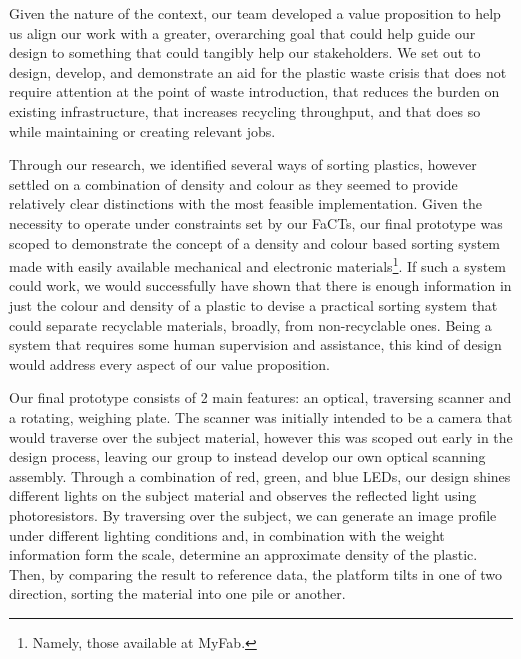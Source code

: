 \documentclass[12pt]{article}
\begin{document}
        Given the nature of the context, our team developed a value proposition to help us align our work with a greater, overarching goal that could help guide our design to something that could tangibly help our stakeholders. We set out to design, develop, and demonstrate an aid for the plastic waste crisis that does not require attention at the point of waste introduction, that reduces the burden on existing infrastructure, that increases recycling throughput, and that does so while maintaining or creating relevant jobs.

        Through our research, we identified several ways of sorting plastics, however settled on a combination of density and colour as they seemed to provide relatively clear distinctions \cite{gent2009recycling} \cite{safavi2010sorting} \cite{bruno2000automated} with the most feasible implementation. Given the necessity to operate under constraints set by our FaCTs, our final prototype was scoped to demonstrate the concept of a density and colour based sorting system made with easily available mechanical and electronic materials\footnote{Namely, those available at MyFab.}. If such a system could work, we would successfully have shown that there is enough information in just the colour and density of a plastic to devise a practical sorting system that could separate recyclable materials, broadly, from non-recyclable ones. Being a system that requires some human supervision and assistance, this kind of design would address every aspect of our value proposition. 

        Our final prototype consists of 2 main features: an optical, traversing scanner and a rotating, weighing plate. The scanner was initially intended to be a camera that would traverse over the subject material, however this was scoped out early in the design process, leaving our group to instead develop our own optical scanning assembly. Through a combination of red, green, and blue LEDs, our design shines different lights on the subject material and observes the reflected light using photoresistors. By traversing over the subject, we can generate an image profile under different lighting conditions and, in combination with the weight information form the scale, determine an approximate density of the plastic. Then, by comparing the result to reference data, the platform tilts in one of two direction, sorting the material into one pile or another.

    \newpage

    \tableofcontents
\end{document}
